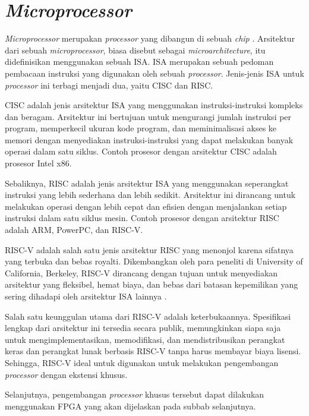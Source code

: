 \section{\textit{Microprocessor}}

\textit{Microprocessor} merupakan \textit{processor} yang dibangun di sebuah \textit{chip} \parencite{sarah2021digital}. Arsitektur dari sebuah \textit{microprocessor}, biasa disebut sebagai \textit{microarchitecture}, itu didefinisikan menggunakan sebuah \acf{ISA}. \ac{ISA} merupakan sebuah pedoman pembacaan instruksi yang digunakan oleh sebuah \textit{processor}. Jenis-jenis \ac{ISA} untuk \textit{processor} ini terbagi menjadi dua, yaitu \ac{CISC} dan \ac{RISC}.

\ac{CISC} adalah jenis arsitektur ISA yang menggunakan instruksi-instruksi kompleks dan beragam. Arsitektur ini bertujuan untuk mengurangi jumlah instruksi per program, memperkecil ukuran kode program, dan meminimalisasi akses ke memori dengan menyediakan instruksi-instruksi yang dapat melakukan banyak operasi dalam satu siklus. Contoh prosesor dengan arsitektur \ac{CISC} adalah prosesor Intel x86.

Sebaliknya, \ac{RISC} adalah jenis arsitektur ISA yang menggunakan seperangkat instruksi yang lebih sederhana dan lebih sedikit. Arsitektur ini dirancang untuk melakukan operasi dengan lebih cepat dan efisien dengan menjalankan setiap instruksi dalam satu siklus mesin. Contoh prosesor dengan arsitektur \ac{RISC} adalah ARM, PowerPC, dan RISC-V.

RISC-V adalah salah satu jenis arsitektur \ac{RISC} yang menonjol karena sifatnya yang terbuka dan bebas royalti. Dikembangkan oleh para peneliti di University of California, Berkeley, RISC-V dirancang dengan tujuan untuk menyediakan arsitektur yang fleksibel, hemat biaya, dan bebas dari batasan kepemilikan yang sering dihadapi oleh arsitektur \ac{ISA} lainnya \parencite{asanovic2014risc}.

Salah satu keunggulan utama dari RISC-V adalah keterbukaannya. Spesifikasi lengkap dari arsitektur ini tersedia secara publik, memungkinkan siapa saja untuk mengimplementasikan, memodifikasi, dan mendistribusikan perangkat keras dan perangkat lunak berbasis RISC-V tanpa harus membayar biaya lisensi. Sehingga, RISC-V ideal untuk digunakan untuk melakukan pengembangan \textit{processor} dengan ekstensi khusus.

Selanjutnya, pengembangan \textit{processor} khusus tersebut dapat dilakukan menggunakan \acl{FPGA} yang akan dijelaskan pada subbab selanjutnya.
